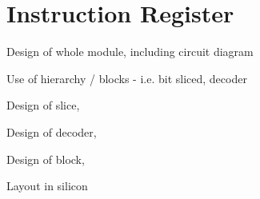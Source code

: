
\section{Instruction Register}


Design of whole module, including circuit diagram

Use of hierarchy / blocks - i.e. bit sliced, decoder

Design of slice,

Design of decoder,

Design of block,

Layout in silicon

